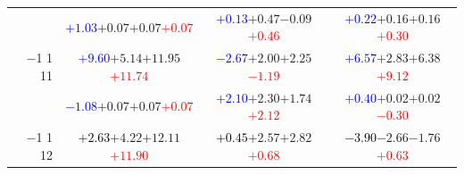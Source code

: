 \documentclass[compress]{beamer}
\begin{document}
\begin{frame}
\begin{tabular}{r | c | c | c}
          & \textcolor{blue}{$+1.03$}\hspace{0.1 cm}$+0.07$\hspace{0.1 cm}$+0.07$\hspace{0.1 cm}\textcolor{red}{$+0.07$} & \textcolor{blue}{$+0.13$}\hspace{0.1 cm}$+0.47$\hspace{0.1 cm}$-0.09$\hspace{0.1 cm}\textcolor{red}{$+0.46$} & \textcolor{blue}{$+0.22$}\hspace{0.1 cm}$+0.16$\hspace{0.1 cm}$+0.16$\hspace{0.1 cm}\textcolor{red}{$+0.30$} \\
$-$1 1 11 & \textcolor{blue}{$+9.60$}\hspace{0.1 cm}$+5.14$\hspace{0.1 cm}$+11.95$\hspace{0.1 cm}\textcolor{red}{$+11.74$} & \textcolor{blue}{$-2.67$}\hspace{0.1 cm}$+2.00$\hspace{0.1 cm}$+2.25$\hspace{0.1 cm}\textcolor{red}{$-1.19$} & \textcolor{blue}{$+6.57$}\hspace{0.1 cm}$+2.83$\hspace{0.1 cm}$+6.38$\hspace{0.1 cm}\textcolor{red}{$+9.12$} \\
          & \textcolor{blue}{$-1.08$}\hspace{0.1 cm}$+0.07$\hspace{0.1 cm}$+0.07$\hspace{0.1 cm}\textcolor{red}{$+0.07$} & \textcolor{blue}{$+2.10$}\hspace{0.1 cm}$+2.30$\hspace{0.1 cm}$+1.74$\hspace{0.1 cm}\textcolor{red}{$+2.12$} & \textcolor{blue}{$+0.40$}\hspace{0.1 cm}$+0.02$\hspace{0.1 cm}$+0.02$\hspace{0.1 cm}\textcolor{red}{$-0.30$} \\
$-$1 1 12 & \textcolor{black}{$+2.63$}\hspace{0.1 cm}$+4.22$\hspace{0.1 cm}$+12.11$\hspace{0.1 cm}\textcolor{red}{$+11.90$} & \textcolor{black}{$+0.45$}\hspace{0.1 cm}$+2.57$\hspace{0.1 cm}$+2.82$\hspace{0.1 cm}\textcolor{red}{$+0.68$} & \textcolor{black}{$-3.90$}\hspace{0.1 cm}$-2.66$\hspace{0.1 cm}$-1.76$\hspace{0.1 cm}\textcolor{red}{$+0.63$} \\

\end{tabular}
\end{frame}
\end{document}
